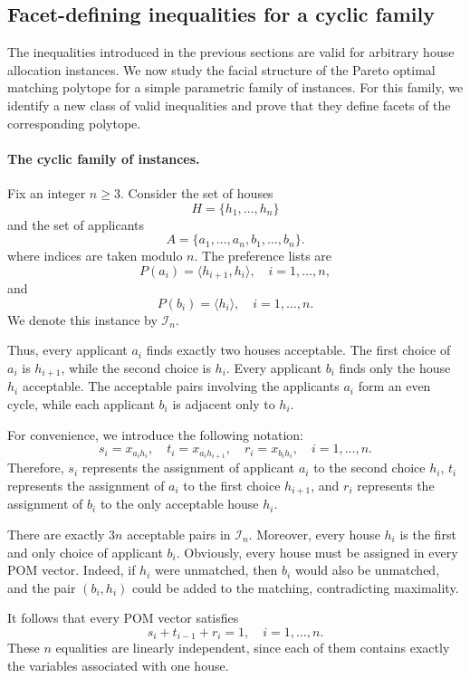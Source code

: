 \documentclass[12pt]{report}
\numberwithin{algorithm}{chapter}
\begin{document}
	
	\subsection{Facet-defining inequalities for a cyclic family}
	
	The inequalities introduced in the previous sections are valid for arbitrary house allocation instances. We now study the facial structure of the Pareto optimal matching polytope for a simple parametric family of instances. For this family, we identify a new class of valid inequalities and prove that they define facets of the corresponding polytope.
	
	\paragraph{The cyclic family of instances.}
	Fix an integer $n\ge 3$. Consider the set of houses
	\[
	H=\{h_1,\ldots,h_n\}
	\]
	and the set of applicants
	\[
	A=\{a_1,\ldots,a_n,b_1,\ldots,b_n\}.
	\]
	where indices are taken modulo $n$. The preference lists are
	\[
	P(a_i)=\langle h_{i+1},h_i\rangle,
	\quad i=1,\ldots,n,
	\]
	and
	\[
	P(b_i)=\langle h_i\rangle,
	\quad i=1,\ldots,n.
	\]
	We denote this instance by $\mathcal{I}_n$.
	
	Thus, every applicant $a_i$ finds exactly two houses acceptable. The first choice of $a_i$ is $h_{i+1}$, while the second choice is $h_i$. Every applicant $b_i$ finds only the house $h_i$ acceptable. The acceptable pairs involving the applicants $a_i$ form an even cycle, while each applicant $b_i$ is adjacent only to $h_i$.
	
	For convenience, we introduce the following notation:
	\[
	s_i=x_{a_i h_i},
	\quad
	t_i=x_{a_i h_{i+1}},
	\quad
	r_i=x_{b_i h_i},
	\quad i=1,\ldots,n.
	\]
	Therefore, $s_i$ represents the assignment of applicant $a_i$ to the second choice $h_i$, $t_i$ represents the assignment of $a_i$ to the first choice $h_{i+1}$, and $r_i$ represents the assignment of $b_i$ to the only acceptable house $h_i$.
	
	There are exactly $3n$ acceptable pairs in $\mathcal{I}_n$. Moreover, every house $h_i$ is the first and only choice of applicant $b_i$. Obviously, every house must be assigned in every POM vector. Indeed, if $h_i$ were unmatched, then $b_i$ would also be unmatched, and the pair $(b_i,h_i)$ could be added to the matching, contradicting maximality.
	
	It follows that every POM vector satisfies
	\begin{equation}\label{eq:cyclic-house-assignment}
		s_i+t_{i-1}+r_i=1,
		\quad i=1,\ldots,n.
	\end{equation}
	These $n$ equalities are linearly independent, since each of them contains exactly the variables associated with one house.
	
\end{document}
